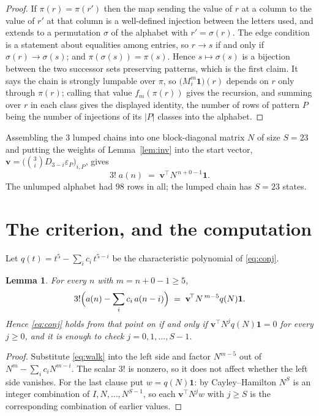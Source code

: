 \documentclass[11pt,a4paper]{article}
\theoremstyle{plain}
\newtheorem{lemma}[theorem]{Lemma}
\theoremstyle{definition}
\begin{document}
\begin{proof}
If $\pi(r)=\pi(r')$ then the map sending the value of $r$ at a column to the value of $r'$
at that column is a well-defined injection between the letters used, and extends to a
permutation $\sigma$ of the alphabet with $r'=\sigma(r)$. The edge condition is a statement
about equalities among entries, so $r\to s$ if and only if $\sigma(r)\to\sigma(s)$; and
$\pi(\sigma(s))=\pi(s)$. Hence $s\mapsto\sigma(s)$ is a bijection between the two successor
sets preserving patterns, which is the first claim. It says the chain is strongly lumpable
over $\pi$, so $\bigl(M_i^{m}\mathbf{1}\bigr)(r)$ depends on $r$ only through $\pi(r)$;
calling that value $f_m(\pi(r))$ gives the recursion, and summing over $r$ in each class
gives the displayed identity, the number of rows of pattern $P$ being the number of
injections of its $|P|$ classes into the alphabet.
\end{proof}

Assembling the $3$ lumped chains into one block-diagonal matrix $N$ of size $S=23$ and
putting the weights of Lemma~\ref{lem:inv} into the start vector,
$\mathbf{v}=\bigl(\binom{3}{i}D_{3-i}\varepsilon_P\bigr)_{i,P}$, gives
\begin{equation}\label{eq:walk}
3!\;a(n)\;=\;\mathbf{v}^{\!\top}N^{\,n+0-1}\mathbf{1} .
\end{equation}
The unlumped alphabet had $98$ rows in all; the lumped chain has $S=23$ states.

\section{The criterion, and the computation}

Let $q(t)=t^{5}-\sum_i c_i\,t^{5-i}$ be the characteristic polynomial of
\eqref{eq:conj}.

\begin{lemma}\label{lem:crit}
For every $n$ with $m=n+0-1\ge5$,
\[
3!\Bigl(a(n)-\sum_i c_i\,a(n-i)\Bigr)\;=\;\mathbf{v}^{\!\top}N^{\,m-5}q(N)\mathbf{1} .
\]
Hence \eqref{eq:conj} holds from that point on if and only if
$\mathbf{v}^{\!\top}N^{j}q(N)\mathbf{1}=0$ for every $j\ge0$, and it is enough to check
$j=0,1,\dots,S-1$.
\end{lemma}

\begin{proof}
Substitute \eqref{eq:walk} into the left side and factor $N^{m-5}$ out of
$N^{m}-\sum_i c_iN^{m-i}$. The scalar $3!$ is nonzero, so it does not affect whether
the left side vanishes. For the last clause put $w=q(N)\mathbf{1}$: by Cayley--Hamilton
$N^{S}$ is an integer combination of $I,N,\dots,N^{S-1}$, so each
$\mathbf{v}^{\!\top}N^{j}w$ with $j\ge S$ is the corresponding combination of earlier
values.
\end{proof}
\end{document}

